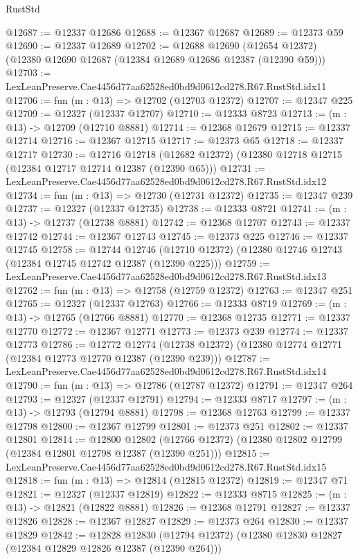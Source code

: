 \begin{lexlean}{RustStd}
\begin{coremodule}
@12687 := @12337 @12686
@12688 := @12367 @12687
@12689 := @12373 @59
@12690 := @12337 @12689
@12702 := @12688
    @12690
    (@12654 @12372)
    (@12380 @12690 @12687 (@12384 @12689 @12686 @12387 (@12390 @59)))
@12703 := LexLeanPreserve.Cae4456d77aa62528ed0bd9d0612cd278.R67.RustStd.idx11
@12706 := fun (m : @13) => @12702 (@12703 @12372)
@12707 := @12347 @225
@12709 := @12327 (@12337 @12707)
@12710 := @12333 @8723
@12713 := (m : @13) -> @12709 (@12710 @8881)
@12714 := @12368 @12679
@12715 := @12337 @12714
@12716 := @12367 @12715
@12717 := @12373 @65
@12718 := @12337 @12717
@12730 := @12716
    @12718
    (@12682 @12372)
    (@12380 @12718 @12715 (@12384 @12717 @12714 @12387 (@12390 @65)))
@12731 := LexLeanPreserve.Cae4456d77aa62528ed0bd9d0612cd278.R67.RustStd.idx12
@12734 := fun (m : @13) => @12730 (@12731 @12372)
@12735 := @12347 @239
@12737 := @12327 (@12337 @12735)
@12738 := @12333 @8721
@12741 := (m : @13) -> @12737 (@12738 @8881)
@12742 := @12368 @12707
@12743 := @12337 @12742
@12744 := @12367 @12743
@12745 := @12373 @225
@12746 := @12337 @12745
@12758 := @12744
    @12746
    (@12710 @12372)
    (@12380 @12746 @12743 (@12384 @12745 @12742 @12387 (@12390 @225)))
@12759 := LexLeanPreserve.Cae4456d77aa62528ed0bd9d0612cd278.R67.RustStd.idx13
@12762 := fun (m : @13) => @12758 (@12759 @12372)
@12763 := @12347 @251
@12765 := @12327 (@12337 @12763)
@12766 := @12333 @8719
@12769 := (m : @13) -> @12765 (@12766 @8881)
@12770 := @12368 @12735
@12771 := @12337 @12770
@12772 := @12367 @12771
@12773 := @12373 @239
@12774 := @12337 @12773
@12786 := @12772
    @12774
    (@12738 @12372)
    (@12380 @12774 @12771 (@12384 @12773 @12770 @12387 (@12390 @239)))
@12787 := LexLeanPreserve.Cae4456d77aa62528ed0bd9d0612cd278.R67.RustStd.idx14
@12790 := fun (m : @13) => @12786 (@12787 @12372)
@12791 := @12347 @264
@12793 := @12327 (@12337 @12791)
@12794 := @12333 @8717
@12797 := (m : @13) -> @12793 (@12794 @8881)
@12798 := @12368 @12763
@12799 := @12337 @12798
@12800 := @12367 @12799
@12801 := @12373 @251
@12802 := @12337 @12801
@12814 := @12800
    @12802
    (@12766 @12372)
    (@12380 @12802 @12799 (@12384 @12801 @12798 @12387 (@12390 @251)))
@12815 := LexLeanPreserve.Cae4456d77aa62528ed0bd9d0612cd278.R67.RustStd.idx15
@12818 := fun (m : @13) => @12814 (@12815 @12372)
@12819 := @12347 @71
@12821 := @12327 (@12337 @12819)
@12822 := @12333 @8715
@12825 := (m : @13) -> @12821 (@12822 @8881)
@12826 := @12368 @12791
@12827 := @12337 @12826
@12828 := @12367 @12827
@12829 := @12373 @264
@12830 := @12337 @12829
@12842 := @12828
    @12830
    (@12794 @12372)
    (@12380 @12830 @12827 (@12384 @12829 @12826 @12387 (@12390 @264)))

\end{coremodule}
\end{lexlean}
